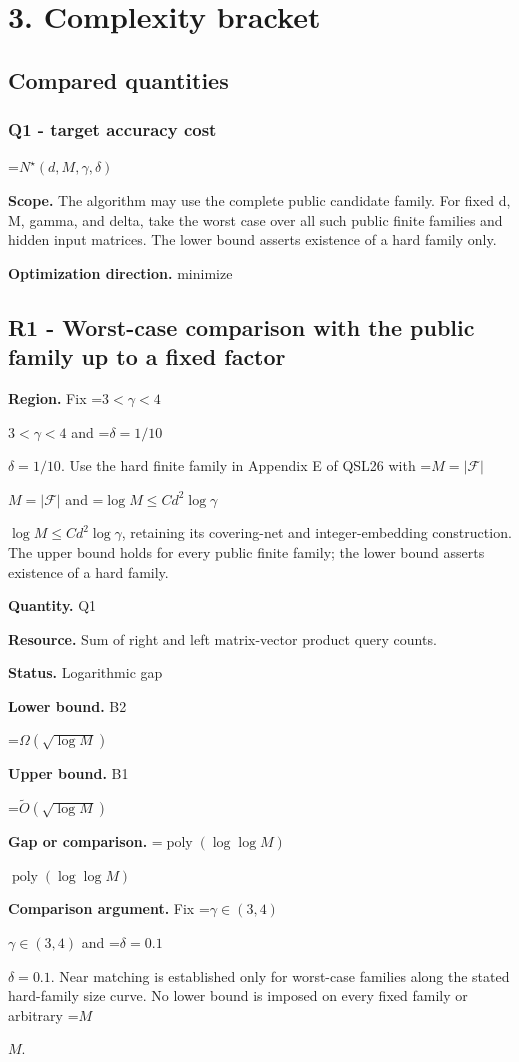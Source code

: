 \documentclass[10pt,a4paper]{article}
\newcommand{\AtlasMath}[1]{\par\begingroup\centering\setbox0=\hbox{$\displaystyle #1$}\ifdim\wd0>1.4\linewidth\typeout{ATLAS WIDE FORMULA: \the\wd0}\fi\ifdim\wd0>\linewidth\resizebox{\linewidth}{!}{\box0}\else\box0\fi\par\endgroup}
\newcommand{\AtlasInlineMath}[1]{\begingroup\setbox0=\hbox{$#1$}\ifdim\wd0>.4\linewidth\endgroup\AtlasMath{#1}\else\endgroup$#1$\fi}
\begin{document}
\section{3. Complexity bracket}
\subsection{Compared quantities}
\subsubsection{Q1 - target accuracy cost}
\AtlasMath{N^\star(d,M,\gamma,\delta)}
\textbf{Scope.} The algorithm may use the complete public candidate family. For fixed d, M, gamma, and delta, take the worst case over all such public finite families and hidden input matrices. The lower bound asserts existence of a hard family only.

\textbf{Optimization direction.} minimize

\subsection{R1 - Worst-case comparison with the public family up to a fixed factor}
\textbf{Region.} Fix \AtlasInlineMath{3<\gamma<4} and \AtlasInlineMath{\delta=1/10}. Use the hard finite family in Appendix E of QSL26 with \AtlasInlineMath{M=|\mathcal{F}|} and \AtlasInlineMath{\log M\le C d^2\log\gamma}, retaining its covering-net and integer-embedding construction. The upper bound holds for every public finite family; the lower bound asserts existence of a hard family.

\textbf{Quantity.} Q1

\textbf{Resource.} Sum of right and left matrix-vector product query counts.

\textbf{Status.} Logarithmic gap

\textbf{Lower bound.} B2

\AtlasMath{\Omega(\sqrt{\log M})}
\textbf{Upper bound.} B1

\AtlasMath{\widetilde{O}(\sqrt{\log M})}
\textbf{Gap or comparison.} \AtlasInlineMath{\operatorname{poly}(\log\log M)}

\textbf{Comparison argument.} Fix \AtlasInlineMath{\gamma\in(3,4)} and \AtlasInlineMath{\delta=0.1}. Near matching is established only for worst-case families along the stated hard-family size curve. No lower bound is imposed on every fixed family or arbitrary \AtlasInlineMath{M}.
\end{document}
